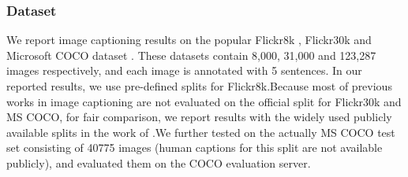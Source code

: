 \documentclass[10pt,journal,compsoc]{IEEEtran}
\begin{document}
\subsubsection{Dataset}
We report image captioning results on the popular Flickr8k \cite{hodosh2013framing}, Flickr30k \cite{young2014image} and Microsoft COCO dataset \cite{lin2014microsoft}. These datasets contain 8,000, 31,000 and 123,287 images respectively, and each image is annotated with 5 sentences. In our reported results, we use pre-defined splits for Flickr8k.Because most of previous works in image captioning \cite{donahue2014long,fang2014captions,Karpathy2014deepvs,mao2014deep,vinyals2014show,xu2015show} are not evaluated on the official split for Flickr30k and MS COCO, for fair comparison, we report results with the widely used publicly available splits in the work of \cite{Karpathy2014deepvs}.We further tested on the actually MS COCO test set consisting of 40775 images (human captions for this split are not available publicly), and evaluated them on the COCO evaluation server.
\end{document}
